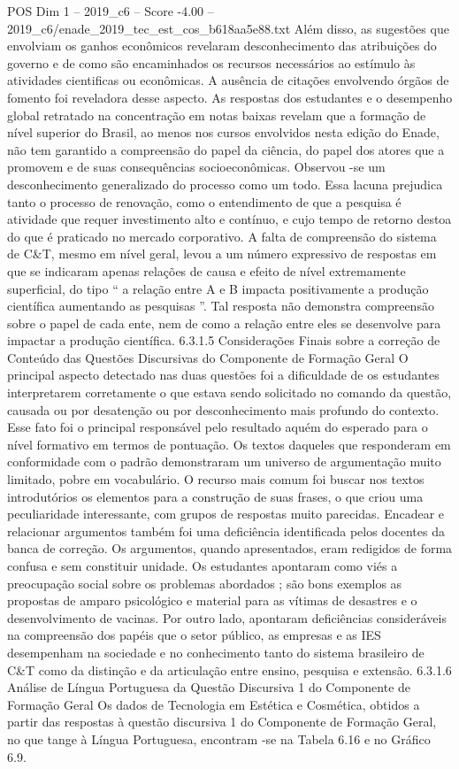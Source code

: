 \begin{textsample}{POS Dim 1 – 2019\_c6 – Score -4.00 – 2019\_c6/enade\_2019\_tec\_est\_cos\_b618aa5e88.txt}
Além disso, as sugestões que envolviam os ganhos econômicos revelaram desconhecimento das atribuições do governo e de como são encaminhados os recursos necessários ao estímulo às atividades cientificas ou econômicas.
A ausência de citações envolvendo órgãos de fomento foi reveladora desse aspecto.
As respostas dos estudantes e o desempenho global retratado na concentração em notas baixas revelam que a formação de nível superior do Brasil, ao menos nos cursos envolvidos nesta edição do Enade, não tem garantido a compreensão do papel da ciência, do papel dos atores que a promovem e de suas consequências socioeconômicas.
Observou -se um desconhecimento generalizado do processo como um todo.
Essa lacuna prejudica tanto o processo de renovação, como o entendimento de que a pesquisa é atividade que requer investimento alto e contínuo, e cujo tempo de retorno destoa do que é praticado no mercado corporativo.
A falta de compreensão do sistema de C\&T, mesmo em nível geral, levou a um número expressivo de respostas em que se indicaram apenas relações de causa e efeito de nível extremamente superficial, do tipo “ a relação entre A e B impacta positivamente a produção científica aumentando as pesquisas ”.
Tal resposta não demonstra compreensão sobre o papel de cada ente, nem de como a relação entre eles se desenvolve para impactar a produção científica. 6.3.1.5 Considerações Finais sobre a correção de Conteúdo das Questões Discursivas do Componente de Formação Geral O principal aspecto detectado nas duas questões foi a dificuldade de os estudantes interpretarem corretamente o que estava sendo solicitado no comando da questão, causada ou por desatenção ou por desconhecimento mais profundo do contexto.
Esse fato foi o principal responsável pelo resultado aquém do esperado para o nível formativo em termos de pontuação.
Os textos daqueles que responderam em conformidade com o padrão demonstraram um universo de argumentação muito limitado, pobre em vocabulário.
O recurso mais comum foi buscar nos textos introdutórios os elementos para a construção de suas frases, o que criou uma peculiaridade interessante, com grupos de respostas muito parecidas.
Encadear e relacionar argumentos também foi uma deficiência identificada pelos docentes da banca de correção.
Os argumentos, quando apresentados, eram redigidos de forma confusa e sem constituir unidade.
Os estudantes apontaram como viés a preocupação social sobre os problemas abordados ; são bons exemplos as propostas de amparo psicológico e material para as vítimas de desastres e o desenvolvimento de vacinas.
Por outro lado, apontaram deficiências consideráveis na compreensão dos papéis que o setor público, as empresas e as IES desempenham na sociedade e no conhecimento tanto do sistema brasileiro de C\&T como da distinção e da articulação entre ensino, pesquisa e extensão. 6.3.1.6 Análise de Língua Portuguesa da Questão Discursiva 1 do Componente de Formação Geral Os dados de Tecnologia em Estética e Cosmética, obtidos a partir das respostas à questão discursiva 1 do Componente de Formação Geral, no que tange à Língua Portuguesa, encontram -se na Tabela 6.16 e no Gráfico 6.9.

\end{textsample}
